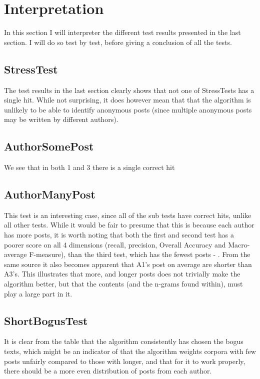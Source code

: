 \section{Interpretation}
\label{interpretation}
In this section I will interpreter the different test results presented in the last section. I will do so test by test, before giving a conclusion of all the tests.

\subsection{StressTest}
The test results in the last section clearly shows that not one of StressTests has a single hit. While not surprising, it does however mean that that the algorithm is unlikely to be able to identify anonymous posts (since multiple anonymous posts may be written by different authors).

\subsection{AuthorSomePost}
We see that in both 1 and 3 there is a single correct hit

\subsection{AuthorManyPost}
This test is an interesting case, since all of the sub tests have correct hits, unlike all other tests. While it would be fair to presume that this is because each author has more posts, it is worth noting that both the first and second test has a poorer score on all 4 dimensions (recall, precision, Overall Accuracy and Macro-average F-measure), than the third test, which has the fewest posts - . From the same source it also becomes apparent that A1's post on average are shorter than A3's. This illustrates that more, and longer posts does not trivially make the algorithm better, but that the contents (and the n-grams found within), must play a large part in it.

\subsection{ShortBogusTest}
It is clear from the table that the algorithm consistently has chosen the bogus texts, which might be an indicator of that the algorithm weights corpora with few posts unfairly compared to those with longer, and that for it to work properly, there should be a more even distribution of posts from each author.\\


